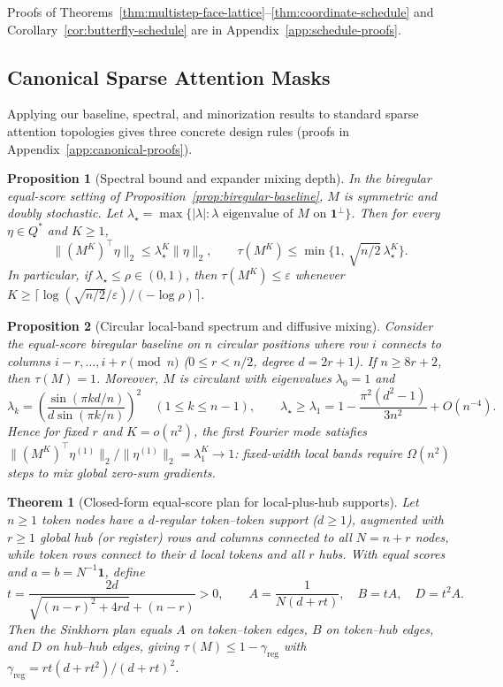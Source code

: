 \documentclass[10pt]{article}
\newtheorem{theorem}{Theorem}
\newtheorem{proposition}{Proposition}
\newcommand{\one}{\mathbf{1}}
\begin{document}
Proofs of Theorems~\ref{thm:multistep-face-lattice}--\ref{thm:coordinate-schedule} and Corollary~\ref{cor:butterfly-schedule} are in Appendix~\ref{app:schedule-proofs}.

\subsection{Canonical Sparse Attention Masks}
\label{sec:canonical-topologies}

Applying our baseline, spectral, and minorization results to standard sparse attention topologies gives three concrete design rules (proofs in Appendix~\ref{app:canonical-proofs}).

\begin{proposition}[Spectral bound and expander mixing depth]
\label{prop:spectral-bound}
In the biregular equal-score setting of Proposition~\ref{prop:biregular-baseline}, $M$ is symmetric and doubly stochastic. Let $\lambda_\star = \max\{|\lambda| : \lambda \text{ eigenvalue of } M \text{ on } \one^\perp\}$. Then for every $\eta \in Q^*$ and $K \ge 1$,
\[
  \|(M^K)^\top \eta\|_2 \le \lambda_\star^K \|\eta\|_2,
  \qquad
  \tau(M^K) \le \min\!\bigl\{1,\, \sqrt{n/2}\,\lambda_\star^K\bigr\}.
\]
In particular, if $\lambda_\star \le \rho \in (0,1)$, then $\tau(M^K) \le \varepsilon$ whenever $K \ge \lceil \log(\sqrt{n/2}/\varepsilon) / (-\log\rho) \rceil$.
\end{proposition}

\begin{proposition}[Circular local-band spectrum and diffusive mixing]
\label{prop:circular-band}
Consider the equal-score biregular baseline on $n$ circular positions where row $i$ connects to columns $i-r,\dots,i+r \pmod n$ ($0 \le r < n/2$, degree $d = 2r+1$). If $n \ge 8r + 2$, then $\tau(M) = 1$. Moreover, $M$ is circulant with eigenvalues $\lambda_0 = 1$ and
\[
  \lambda_k = \left(\frac{\sin(\pi k d / n)}{d \sin(\pi k / n)}\right)^2 \quad (1 \le k \le n-1),
  \qquad
  \lambda_\star \ge \lambda_1 = 1 - \frac{\pi^2(d^2-1)}{3n^2} + O(n^{-4}).
\]
Hence for fixed $r$ and $K = o(n^2)$, the first Fourier mode satisfies $\|(M^K)^\top \eta^{(1)}\|_2 / \|\eta^{(1)}\|_2 = \lambda_1^K \to 1$: fixed-width local bands require $\Omega(n^2)$ steps to mix global zero-sum gradients.
\end{proposition}

\begin{theorem}[Closed-form equal-score plan for local-plus-hub supports]
\label{thm:register-hub-plan}
Let $n \ge 1$ token nodes have a $d$-regular token--token support ($d \ge 1$), augmented with $r \ge 1$ global hub (or register) rows and columns connected to all $N = n+r$ nodes, while token rows connect to their $d$ local tokens and all $r$ hubs. With equal scores and $a = b = N^{-1}\one$, define
\[
  t = \frac{2d}{\sqrt{(n-r)^2 + 4rd} + (n-r)} > 0,
  \qquad
  A = \frac{1}{N(d+rt)},
  \quad B = tA,
  \quad D = t^2 A.
\]
Then the Sinkhorn plan equals $A$ on token--token edges, $B$ on token--hub edges, and $D$ on hub--hub edges, giving $\tau(M) \le 1 - \gamma_{\mathrm{reg}}$ with $\gamma_{\mathrm{reg}} = rt(d + rt^2)/(d + rt)^2$.
\end{theorem}
\end{document}
